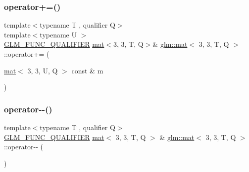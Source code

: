 \mbox{\label{structglm_1_1mat_3_013_00_013_00_01_t_00_01_q_01_4_abc45d059ceb749e219587c8d50e4ecbb}} 
\subsubsection{\texorpdfstring{operator+=()}{operator+=()}\hspace{0.1cm}{\footnotesize\ttfamily [4/4]}}
{\footnotesize\ttfamily template$<$typename T , qualifier Q$>$ \\
template$<$typename U $>$ \\
\mbox{\hyperlink{setup_8hpp_a33fdea6f91c5f834105f7415e2a64407}{G\+L\+M\+\_\+\+F\+U\+N\+C\+\_\+\+Q\+U\+A\+L\+I\+F\+I\+ER}} \mbox{\hyperlink{structglm_1_1mat}{mat}}$<$3, 3, T, Q$>$\& \mbox{\hyperlink{structglm_1_1mat}{glm\+::mat}}$<$ 3, 3, T, Q $>$\+::operator+= (\begin{DoxyParamCaption}\item[{\mbox{\hyperlink{structglm_1_1mat}{mat}}$<$ 3, 3, U, Q $>$ const \&}]{m }\end{DoxyParamCaption})}

\mbox{\label{structglm_1_1mat_3_013_00_013_00_01_t_00_01_q_01_4_ae00b3ec3496cd413781d7169997f666f}} 
\subsubsection{\texorpdfstring{operator-\/-\/()}{operator--()}\hspace{0.1cm}{\footnotesize\ttfamily [1/2]}}
{\footnotesize\ttfamily template$<$typename T , qualifier Q$>$ \\
\mbox{\hyperlink{setup_8hpp_a33fdea6f91c5f834105f7415e2a64407}{G\+L\+M\+\_\+\+F\+U\+N\+C\+\_\+\+Q\+U\+A\+L\+I\+F\+I\+ER}} \mbox{\hyperlink{structglm_1_1mat}{mat}}$<$ 3, 3, T, Q $>$ \& \mbox{\hyperlink{structglm_1_1mat}{glm\+::mat}}$<$ 3, 3, T, Q $>$\+::operator-\/-\/ (\begin{DoxyParamCaption}{ }\end{DoxyParamCaption})}

